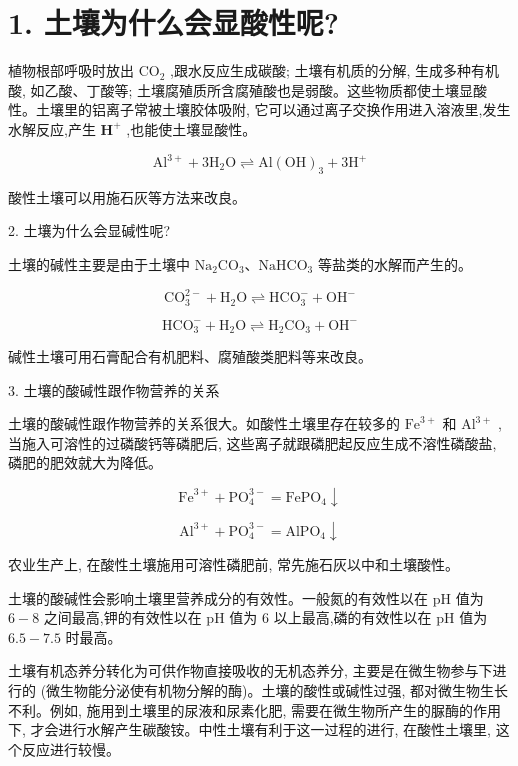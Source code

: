\documentclass[10pt]{article}
\begin{document}
\section*{1. 土壤为什么会显酸性呢?}

植物根部呼吸时放出 \({\mathrm{{CO}}}_{2}\) ,跟水反应生成碳酸; 土壤有机质的分解, 生成多种有机酸, 如乙酸、丁酸等; 土壤腐殖质所含腐殖酸也是弱酸。这些物质都使土壤显酸性。土壤里的铝离子常被土壤胶体吸附, 它可以通过离子交换作用进入溶液里,发生水解反应,产生 \({\mathbf{H}}^{ + }\) ,也能使土壤显酸性。

\[
{\mathrm{{Al}}}^{3 + } + 3{\mathrm{H}}_{2}\mathrm{O} \rightleftharpoons \mathrm{{Al}}{\left( \mathrm{{OH}}\right) }_{3} + 3{\mathrm{H}}^{ + }
\]

酸性土壤可以用施石灰等方法来改良。

2. 土壤为什么会显碱性呢?

土壤的碱性主要是由于土壤中 \({\mathrm{{Na}}}_{2}{\mathrm{{CO}}}_{3}\text{、}{\mathrm{{NaHCO}}}_{3}\) 等盐类的水解而产生的。

\[
{\mathrm{{CO}}}_{3}^{2 - } + {\mathrm{H}}_{2}\mathrm{O} \rightleftharpoons {\mathrm{{HCO}}}_{3}^{ - } + {\mathrm{{OH}}}^{ - }
\]

\[
{\mathrm{{HCO}}}_{3}^{ - } + {\mathrm{H}}_{2}\mathrm{O} \rightleftharpoons {\mathrm{H}}_{2}{\mathrm{{CO}}}_{3} + {\mathrm{{OH}}}^{ - }
\]

碱性土壤可用石膏配合有机肥料、腐殖酸类肥料等来改良。

3. 土壤的酸碱性跟作物营养的关系

土壤的酸碱性跟作物营养的关系很大。如酸性土壤里存在较多的 \({\mathrm{{Fe}}}^{3 + }\) 和 \({\mathrm{{Al}}}^{3 + }\) ,当施入可溶性的过磷酸钙等磷肥后, 这些离子就跟磷肥起反应生成不溶性磷酸盐, 磷肥的肥效就大为降低。

\[
{\mathrm{{Fe}}}^{3 + } + {\mathrm{{PO}}}_{4}^{3 - } = {\mathrm{{FePO}}}_{4} \downarrow
\]

\[
{\mathrm{{Al}}}^{3 + } + {\mathrm{{PO}}}_{4}^{3 - } = {\mathrm{{AlPO}}}_{4} \downarrow
\]

农业生产上, 在酸性土壤施用可溶性磷肥前, 常先施石灰以中和土壤酸性。

土壤的酸碱性会影响土壤里营养成分的有效性。一般氮的有效性以在 \(\mathrm{{pH}}\) 值为 \(6 - 8\) 之间最高,钾的有效性以在 \(\mathrm{{pH}}\) 值为 6 以上最高,磷的有效性以在 \(\mathrm{{pH}}\) 值为 \({6.5} - {7.5}\) 时最高。

土壤有机态养分转化为可供作物直接吸收的无机态养分, 主要是在微生物参与下进行的 (微生物能分泌使有机物分解的酶)。土壤的酸性或碱性过强, 都对微生物生长不利。例如, 施用到土壤里的尿液和尿素化肥, 需要在微生物所产生的脲酶的作用下, 才会进行水解产生碳酸铵。中性土壤有利于这一过程的进行, 在酸性土壤里, 这个反应进行较慢。
\end{document}
